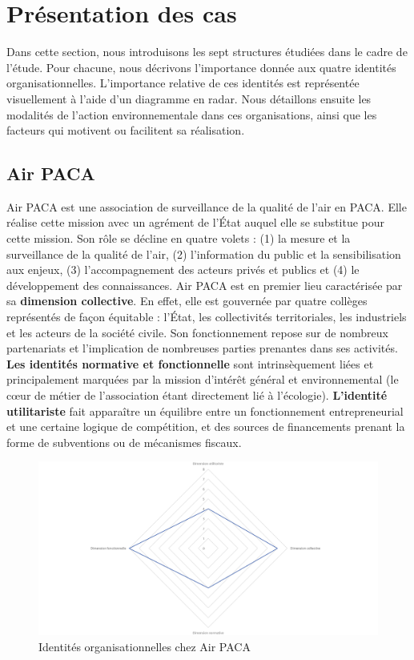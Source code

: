 
\section{Présentation des cas }
    \label{section:detail_cas}

    Dans cette section, nous introduisons les sept structures étudiées dans le cadre de l'étude. Pour chacune, nous décrivons l'importance donnée aux quatre identités organisationnelles. L'importance relative de ces identités est représentée visuellement à l'aide d'un diagramme en radar. Nous détaillons ensuite les modalités de l'action environnementale dans ces organisations, ainsi que les facteurs qui motivent ou facilitent sa réalisation.

    \subsection{Air PACA}

        Air PACA est une association de surveillance de la qualité de l’air en PACA. Elle réalise cette mission avec un agrément de l’État auquel elle se substitue pour cette mission. Son rôle se décline en quatre volets : (1) la mesure et la surveillance de la qualité de l’air, (2) l’information du public et la sensibilisation aux enjeux, (3) l’accompagnement des acteurs privés et publics et (4) le développement des connaissances. Air PACA est en premier lieu caractérisée par sa \textbf{dimension collective}. En effet, elle est gouvernée par quatre collèges représentés de façon équitable : l’État, les collectivités territoriales, les industriels et les acteurs de la société civile. Son fonctionnement repose sur de nombreux partenariats et l’implication de nombreuses parties prenantes dans ses activités. \textbf{Les identités normative et fonctionnelle} sont intrinsèquement liées et principalement marquées par la mission d'intérêt général et environnemental (le cœur de métier de l’association étant directement lié à l’écologie). \textbf{L'identité utilitariste} fait apparaître un équilibre entre un fonctionnement entrepreneurial et une certaine logique de compétition, et des sources de financements prenant la forme de subventions ou de mécanismes fiscaux.

        \begin{figure}[h]
            \caption{Identités organisationnelles chez Air PACA}
            \label{figure:dimairpaca}
            \includegraphics[width=\linewidth]{fig/radars/Air_PACA.png}
        \end{figure}

